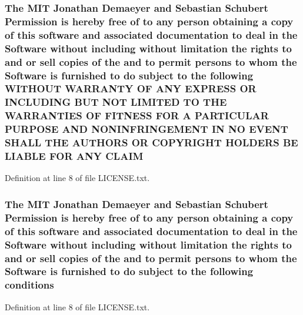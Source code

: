 \subsubsection[{\texorpdfstring{C\+L\+A\+IM}{CLAIM}}]{\setlength{\rightskip}{0pt plus 5cm}The M\+IT Jonathan Demaeyer and Sebastian Schubert Permission is hereby free of to any person obtaining a {\bf copy} of this software and associated documentation to deal in the {\bf Software} without including without limitation the rights to and or sell copies of the and to permit persons to whom the {\bf Software} is furnished to do subject to the following W\+I\+T\+H\+O\+UT W\+A\+R\+R\+A\+N\+TY OF A\+NY E\+X\+P\+R\+E\+SS OR I\+N\+C\+L\+U\+D\+I\+NG B\+UT N\+OT L\+I\+M\+I\+T\+ED TO T\+HE W\+A\+R\+R\+A\+N\+T\+I\+ES OF F\+I\+T\+N\+E\+SS F\+OR A P\+A\+R\+T\+I\+C\+U\+L\+AR P\+U\+R\+P\+O\+SE A\+ND N\+O\+N\+I\+N\+F\+R\+I\+N\+G\+E\+M\+E\+NT IN NO E\+V\+E\+NT S\+H\+A\+LL T\+HE A\+U\+T\+H\+O\+RS OR C\+O\+P\+Y\+R\+I\+G\+HT H\+O\+L\+D\+E\+RS BE L\+I\+A\+B\+LE F\+OR A\+NY C\+L\+A\+IM}\hypertarget{LICENSE_8txt_ac3813fbcca87515f1262b78e8f2969a9}{}\label{LICENSE_8txt_ac3813fbcca87515f1262b78e8f2969a9}


Definition at line 8 of file L\+I\+C\+E\+N\+S\+E.\+txt.

\subsubsection[{\texorpdfstring{conditions}{conditions}}]{\setlength{\rightskip}{0pt plus 5cm}The M\+IT Jonathan Demaeyer and Sebastian Schubert Permission is hereby free of to any person obtaining a {\bf copy} of this software and associated documentation to deal in the {\bf Software} without including without limitation the rights to and or sell copies of the and to permit persons to whom the {\bf Software} is furnished to do subject to the following conditions}\hypertarget{LICENSE_8txt_a49ab5f359597b06e0efbb15cdb0b68e0}{}\label{LICENSE_8txt_a49ab5f359597b06e0efbb15cdb0b68e0}


Definition at line 8 of file L\+I\+C\+E\+N\+S\+E.\+txt.

